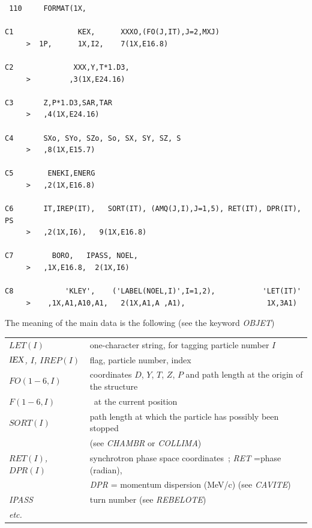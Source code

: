 {{\begin{verbatim}
 110     FORMAT(1X,

C1               KEX,      XXXO,(FO(J,IT),J=2,MXJ)
     >  1P,      1X,I2,    7(1X,E16.8)

C2              XXX,Y,T*1.D3,
     >         ,3(1X,E24.16)

C3       Z,P*1.D3,SAR,TAR 
     >   ,4(1X,E24.16)

C4       SXo, SYo, SZo, So, SX, SY, SZ, S
     >   ,8(1X,E15.7)

C5        ENEKI,ENERG
     >   ,2(1X,E16.8)

C6       IT,IREP(IT),   SORT(IT), (AMQ(J,I),J=1,5), RET(IT), DPR(IT), PS
     >   ,2(1X,I6),   9(1X,E16.8)

C7         BORO,   IPASS, NOEL,    
     >   ,1X,E16.8,  2(1X,I6)

C8            'KLEY',    ('LABEL(NOEL,I)',I=1,2),           'LET(IT)'
     >    ,1X,A1,A10,A1,   2(1X,A1,A ,A1),                   1X,3A1)
\end{verbatim}}
\medskip

\noindent The meaning of the main data is the following (see the keyword \textsl{OBJET})
\medskip

{\renewcommand{\arraystretch}{1}
 \begin{tabular}{>{\sl}l!{~:}l}
	$LET(I) $  & one-character string, for tagging particle number $I$  \\   
	$\IEX\index{IEX@{\IEX}}$, $I$, $IREP(I)$   &  flag, particle number, index  \\
	 $FO(1-6, I)$  &  coordinates $D$, $Y$, $T$, $Z$, $P$ and path
	                 length at the origin of the structure\\
	 $F(1-6, I)$  &  \id\, at the current position\\
     $SORT(I)$ & path length at which the particle has possibly been stopped\\
             & (see \textsl{CHAMBR} or \textsl{COLLIMA})\\
     $RET(I)$, $DPR(I)$ & synchrotron phase space coordinates~; \textsl{RET} =phase (radian),\\
           &   \textsl{DPR} = momentum dispersion (MeV/c) (see \textsl{CAVITE}) \\
    \textsl{IPASS}  &  turn number (see \textsl{REBELOTE}) \\
 etc.
     \end{tabular}}
\medskip

}
